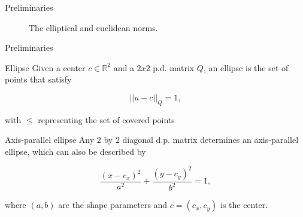 \documentclass{beamer}
\newcommand{\R}{\mathbb{R}}
\begin{document}
\begin{frame}{Preliminaries}
	\begin{figure}[H]
		\centering
		
		\caption{The elliptical and euclidean norms.}
		
		\label{fig:3ellipses_intersect}
	\end{figure}
\end{frame}

\begin{frame}{Preliminaries}
	
	\begin{block}{Ellipse}
		Given a center $c \in \R^2$ and a $2x2$ p.d. matrix $Q$, an ellipse is the set of points that satisfy
		
		\begin{equation*}
		||u-c||_Q = 1,
		\end{equation*}
		
		with $\le$ representing the set of covered points
	\end{block}

	\begin{block}{Axis-parallel ellipse}
		Any $2$ by $2$ diagonal d.p. matrix determines an axis-parallel ellipse, which can also be described by
		
		\begin{equation*}
		\frac{(x-c_x)^2}{a^2} + \frac{(y-c_y)^2}{b^2} = 1,
		\end{equation*}
		
		where $(a,b)$ are the shape parameters and $c=(c_x,c_y)$ is the center.
	\end{block}

\end{frame}
\end{document}
